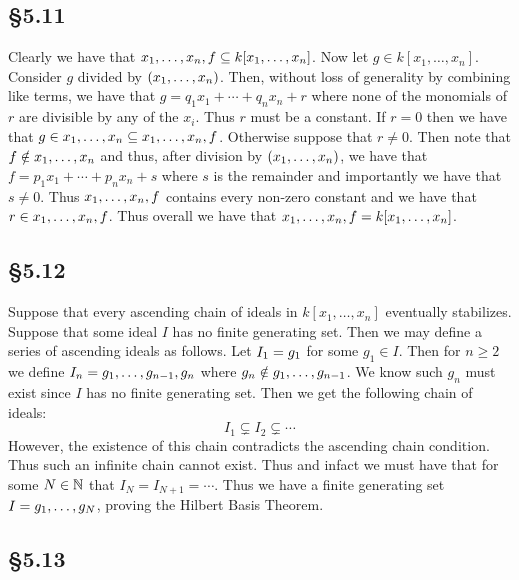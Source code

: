 \documentclass[letterpaper]{article}
\begin{document}
\subsection*{\S 5.11}

Clearly we have that $\gen{x_{1}, \ldots, x_{n}, f} \subseteq k[x_{1}, \ldots, x_{n}]$.
Now let $g \in k[x_{1}, \ldots, x_{n}]$.
Consider $g$ divided by $\pqty{x_{1}, \ldots, x_{n}}$.
Then, without loss of generality by combining like terms, we have that $g = q_{1}x_{1} + \cdots + q_{n}x_{n} + r$ where none of the monomials of $r$ are divisible by any of the $x_{i}$.
Thus $r$ must be a constant.
If $r = 0$ then we have that $g \in \gen{x_{1}, \ldots, x_{n}} \subseteq \gen{x_{1}, \ldots, x_{n}, f}$.
Otherwise suppose that $r \neq 0$.
Then note that $f \notin \gen{x_{1}, \ldots, x_{n}}$ and thus, after division by $\pqty{x_{1}, \ldots, x_{n}}$, we have that $f = p_{1}x_{1} + \cdots + p_{n}x_{n} + s$ where $s$ is the remainder and importantly we have that $s \neq 0$.
Thus $\gen{x_{1}, \ldots, x_{n}, f}$ contains every non-zero constant and we have that $r \in \gen{x_{1}, \ldots, x_{n}, f}$.
Thus overall we have that $\gen{x_{1}, \ldots, x_{n}, f} = k[x_{1}, \ldots, x_{n}]$.

\subsection*{\S 5.12}

Suppose that every ascending chain of ideals in $k[x_{1}, \ldots, x_{n}]$ eventually stabilizes.
Suppose that some ideal $I$ has no finite generating set.
Then we may define a series of ascending ideals as follows.
Let $I_{1} = \gen{g_{1}}$ for some $g_{1} \in I$.
Then for $n \geq 2$ we define $I_{n} = \gen{g_{1}, \ldots, g_{n - 1}, g_{n}}$ where $g_{n} \notin \gen{g_{1}, \ldots, g_{n - 1}}$.
We know such $g_{n}$ must exist since $I$ has no finite generating set.
Then we get the following chain of ideals:
\[
  I_{1} \subsetneq I_{2} \subsetneq \cdots
\]
However, the existence of this chain contradicts the ascending chain condition.
Thus such an infinite chain cannot exist.
Thus and infact we must have that for some $N \in \mathbb{N}$ that $I_{N} = I_{N + 1} = \cdots$.
Thus we have a finite generating set $I = \gen{g_{1}, \ldots, g_{N}}$, proving the Hilbert Basis Theorem.

\subsection*{\S 5.13}
\end{document}
